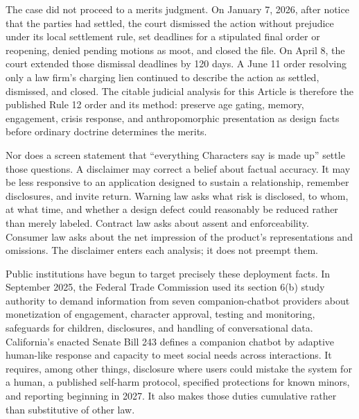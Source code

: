 The case did not proceed to a merits judgment. On January 7, 2026, after notice that the parties had settled, the court dismissed the action without prejudice under its local settlement rule, set deadlines for a stipulated final order or reopening, denied pending motions as moot, and closed the file. On April 8, the court extended those dismissal deadlines by 120 days. A June 11 order resolving only a law firm's charging lien continued to describe the action as settled, dismissed, and closed. The citable judicial analysis for this Article is therefore the published Rule 12 order and its method: preserve age gating, memory, engagement, crisis response, and anthropomorphic presentation as design facts before ordinary doctrine determines the merits.

Nor does a screen statement that ``everything Characters say is made up'' settle those questions. A disclaimer may correct a belief about factual accuracy. It may be less responsive to an application designed to sustain a relationship, remember disclosures, and invite return. Warning law asks what risk is disclosed, to whom, at what time, and whether a design defect could reasonably be reduced rather than merely labeled. Contract law asks about assent and enforceability. Consumer law asks about the net impression of the product's representations and omissions. The disclaimer enters each analysis; it does not preempt them.

Public institutions have begun to target precisely these deployment facts. In September 2025, the Federal Trade Commission used its section 6(b) study authority to demand information from seven companion-chatbot providers about monetization of engagement, character approval, testing and monitoring, safeguards for children, disclosures, and handling of conversational data. California's enacted Senate Bill 243 defines a companion chatbot by adaptive human-like response and capacity to meet social needs across interactions. It requires, among other things, disclosure where users could mistake the system for a human, a published self-harm protocol, specified protections for known minors, and reporting beginning in 2027. It also makes those duties cumulative rather than substitutive of other law.

